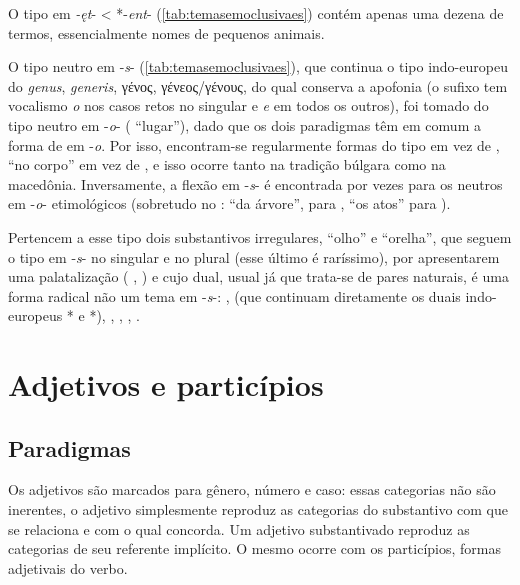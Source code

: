 O tipo em \emph{-ęt}- < *-\emph{ent}- (\autoref{tab:temasemoclusivaes}) contém
apenas uma dezena de termos, essencialmente nomes de pequenos animais.

O tipo neutro em -\emph{s}- (\autoref{tab:temasemoclusivaes}), que continua o tipo
indo-europeu do  \emph{genus}, \emph{generis},
 γένος, γένεος/γένους, do qual conserva a apofonia (o sufixo
tem vocalismo \emph{o} nos
casos retos no singular e \emph{e} em todos os outros), foi tomado do
tipo neutro em -\emph{o}- ( ``lugar''), dado que os
dois paradigmas têm em comum a forma de  em -\emph{o}. Por
isso, encontram-se regularmente formas do tipo 
 em vez de ,  
``no corpo'' em vez de , e isso ocorre tanto na
tradição búlgara como na macedônia. 
Inversamente, a flexão em -\emph{s}-
é encontrada por vezes para os neutros em -\emph{o}- etimológicos
(sobretudo no :   ``da árvore'',
para ,   ``os atos'' para
).

Pertencem a esse tipo dois substantivos irregulares, 
``olho'' e  ``orelha'', que seguem o tipo em -\emph{s}-
no singular e no plural (esse último é raríssimo), por apresentarem uma
palatalização ( , ) e cujo
dual, usual já que trata-se de pares naturais, é uma forma radical não
um tema em -\emph{s}-:  ,  (que
continuam diretamente os duais indo-europeus
*
 e
*), 
, ,  ,
.

\section{Adjetivos e particípios}\label{sec:adjetivos}
\subsection{Paradigmas}\label{sec:adjparadigma}

Os adjetivos são marcados para gênero, número e caso: essas categorias
não são inerentes, o adjetivo simplesmente reproduz as categorias do
substantivo com que se relaciona e com o qual concorda. Um adjetivo
substantivado reproduz as categorias de seu referente implícito. O mesmo
ocorre com os particípios, formas adjetivais do verbo.

